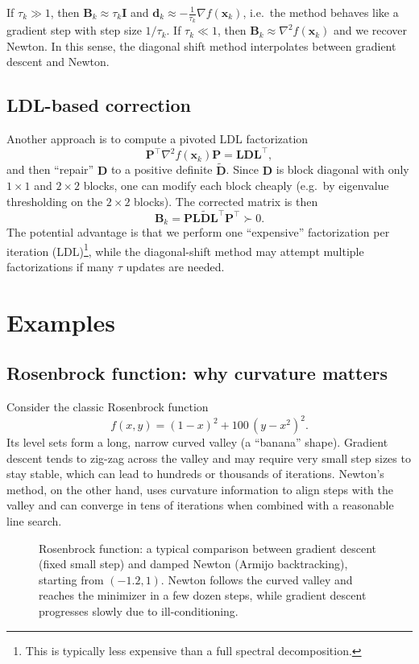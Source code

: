 If $\tau_k\gg 1$, then $\mathbf{B}_k\approx \tau_k \mathbf{I}$ and
$\mathbf{d}_k\approx -\frac{1}{\tau_k}\nabla f(\mathbf{x}_k)$, i.e.\ the method
behaves like a gradient step with step size $1/\tau_k$. If $\tau_k\ll 1$, then
$\mathbf{B}_k\approx \nabla^2 f(\mathbf{x}_k)$ and we recover Newton. In this
sense, the diagonal shift method interpolates between gradient descent and
Newton.

\subsection{LDL-based correction}
Another approach is to compute a pivoted LDL factorization
\[
  \mathbf{P}^\top \nabla^2 f(\mathbf{x}_k)\mathbf{P}
  =\mathbf{L}\mathbf{D}\mathbf{L}^\top,
\]
and then ``repair'' $\mathbf{D}$ to a positive definite $\tilde{\mathbf{D}}$.
Since $\mathbf{D}$ is block diagonal with only $1\times 1$ and $2\times 2$
blocks, one can modify each block cheaply (e.g.\ by eigenvalue thresholding on
the $2\times 2$ blocks). The corrected matrix is then
\[
  \mathbf{B}_k = \mathbf{P}\mathbf{L}\tilde{\mathbf{D}}\mathbf{L}^\top \mathbf{P}^\top \succ 0.
\]
The potential advantage is that we perform one ``expensive'' factorization per
iteration (LDL)\footnote{This is typically less expensive than a full spectral
decomposition.}, while the diagonal-shift method may attempt multiple
factorizations if many $\tau$ updates are needed.

\section{Examples}
\subsection{Rosenbrock function: why curvature matters}
\begin{example}
Consider the classic Rosenbrock function
\[
  f(x,y)=(1-x)^2+100\,(y-x^2)^2.
\]
Its level sets form a long, narrow curved valley (a ``banana'' shape). Gradient
descent tends to zig-zag across the valley and may require very small step sizes
to stay stable, which can lead to hundreds or thousands of iterations. Newton's
method, on the other hand, uses curvature information to align steps with the
valley and can converge in tens of iterations when combined with a reasonable
line search.
\end{example}
\begin{figure}[ht]
    \centering
    \caption{Rosenbrock function: a typical comparison between gradient descent
    (fixed small step) and damped Newton (Armijo backtracking), starting from
    $(-1.2,1)$. Newton follows the curved valley and reaches the minimizer in a
    few dozen steps, while gradient descent progresses slowly due to
    ill-conditioning.}
    \label{fig:rosenbrock-newton-vs-gd}
\end{figure}

